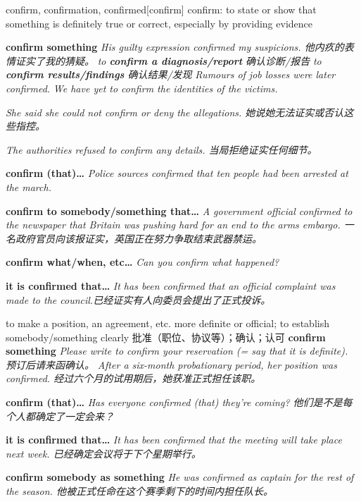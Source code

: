 \begin{DefWord}{confirm, confirmation, confirmed}[confirm]
    confirm: to state or show that something is definitely true or correct, especially by providing evidence

    \textbf{confirm something} \textit{His guilty expression confirmed my suspicions. 他内疚的表情证实了我的猜疑。}
    \textit{to \textbf{confirm a diagnosis/report} 确认诊断/报告}
    \textit{to \textbf{confirm results/findings} 确认结果/发现}
    \textit{Rumours of job losses were later confirmed.}
    \textit{We have yet to confirm the identities of the victims.}

    \textit{She said she could not confirm or deny the allegations. 她说她无法证实或否认这些指控。}

    \textit{The authorities refused to confirm any details. 当局拒绝证实任何细节。}

    \textbf{confirm (that)… } \textit{Police sources confirmed that ten people had been arrested at the march.}
    
    \textbf{confirm to somebody/something that…} \textit{A government official confirmed to the newspaper that Britain was pushing hard for an end to the arms embargo. 一名政府官员向该报证实，英国正在努力争取结束武器禁运。}

    \textbf{confirm what/when, etc…} \textit{Can you confirm what happened?}

    \textbf{it is confirmed that…} 
    \textit{It has been confirmed that an official complaint was made to the council.已经证实有人向委员会提出了正式投诉。}

    to make a position, an agreement, etc. more definite or official; to establish somebody/something clearly 批准（职位、协议等）；确认；认可
    \textbf{confirm something} \textit{Please write to confirm your reservation (= say that it is definite). 预订后请来函确认。}
    \textit{After a six-month probationary period, her position was confirmed. 经过六个月的试用期后，她获准正式担任该职。}

    \textbf{confirm (that)…} \textit{Has everyone confirmed (that) they’re coming? 他们是不是每个人都确定了一定会来？}

    \textbf{it is confirmed that…} \textit{It has been confirmed that the meeting will take place next week. 已经确定会议将于下个星期举行。}

    \textbf{confirm somebody as something} \textit{He was confirmed as captain for the rest of the season. 他被正式任命在这个赛季剩下的时间内担任队长。}


\end{DefWord}
